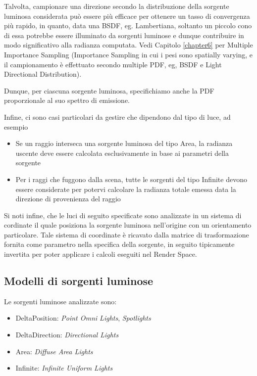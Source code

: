 Talvolta, campionare una direzione secondo la distribuzione della sorgente luminosa considerata pu\`o essere pi\`u efficace per ottenere un tasso di  
convergenza pi\`u rapido, in quanto, data una BSDF, eg. Lambertiana, soltanto un piccolo cono di essa potrebbe essere illuminato da sorgenti 
luminose e dunque contribuire in modo significativo alla radianza computata. Vedi Capitolo \ref{chapter6} per Multiple Importance Sampling 
(Importance Sampling in cui i pesi sono spatially varying, e il campionamento \`e effettuato secondo multiple PDF, eg, BSDF e Light 
Directional Distribution).\par
Dunque, per ciascuna sorgente luminosa, specifichiamo anche la PDF proporzionale al suo spettro di emissione.\par
Infine, ci sono casi particolari da gestire che dipendono dal tipo di luce, ad esempio
\begin{itemize}[topsep=0pt,noitemsep]
	\item Se un raggio interseca una sorgente luminosa del tipo Area, la radianza uscente deve essere calcolata esclusivamente in base ai parametri
		della sorgente
	\item Per i raggi che fuggono dalla scena, tutte\footnotemark{} le sorgenti del tipo Infinite devono essere considerate per potervi calcolare 
		la radianza totale emessa data la direzione di provenienza del raggio
\end{itemize}
Si noti infine, che le luci di seguito specificate sono analizzate in un sistema di cordinate il quale posiziona la sorgente luminosa nell'origine
con un orientamento particolare. Tale sistema di coordinate \`e ricavato dalla matrice di trasformazione fornita come parametro nella 
specifica della sorgente, in seguito tipicamente invertita per poter applicare i calcoli eseguiti nel Render Space.\par
\subsection{Modelli di sorgenti luminose}
Le sorgenti luminose analizzate sono: 
\begin{itemize}[topsep=0pt,noitemsep]
	\item DeltaPosition: \textit{Point Omni Lights}, \textit{Spotlights}
	\item DeltaDirection: \textit{Directional Lights}
	\item Area: \textit{Diffuse Area Lights}
	\item Infinite: \textit{Infinite Uniform Lights}
\end{itemize}
